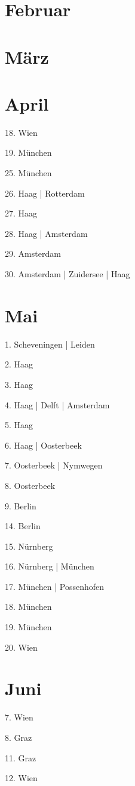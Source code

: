 \documentclass[twoside=false,titlepage=false,open=any, parskip=never, fontsize=10pt, headings=small, chapterprefix=false, appendixprefix=false, DIV=15]{scrbook}
\begin{document}
\begin{multicols}{3}
            \section*{Februar}
            \section*{März}
            \section*{April}
            18. Wien\par
            19. München\par
            25. München\par
            26. Haag | Rotterdam\par
            27. Haag\par
            28. Haag | Amsterdam\par
            29. Amsterdam\par
            30. Amsterdam | Zuidersee | Haag\par
            \section*{Mai}
            1. Scheveningen | Leiden\par
            2. Haag\par
            3. Haag\par
            4. Haag | Delft | Amsterdam\par
            5. Haag\par
            6. Haag | Oosterbeek\par
            7. Oosterbeek | Nymwegen\par
            8. Oosterbeek\par
            9. Berlin\par
            14. Berlin\par
            15. Nürnberg\par
            16. Nürnberg | München\par
            17. München | Possenhofen\par
            18. München\par
            19. München\par
            20. Wien\par
            \section*{Juni}
            7. Wien\par
            8. Graz\par
            11. Graz\par
            12. Wien\par

\end{multicols}
\end{document}
